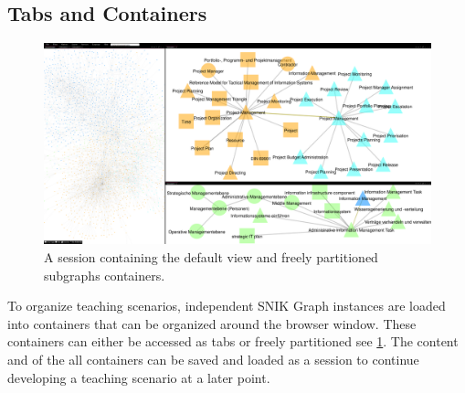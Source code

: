 \documentclass[conference]{IEEEtran}
\begin{document}
\subsection{Tabs and Containers}
\begin{figure}[h]
    \centering
    \includegraphics[width=\linewidth]{tabs.png}
    \caption{A session containing the default view and freely partitioned subgraphs containers.}
	\label{fig:tabs}
\end{figure}
\vspace{-3pt}
To organize teaching scenarios, independent SNIK Graph instances are loaded into containers\footnotemark{} that can be organized around the browser window.
These containers can either be accessed as tabs or freely partitioned see \cref{fig:tabs}.
The content and of the all containers can be saved and loaded as a session to continue developing a teaching scenario at a later point.

\end{document}
